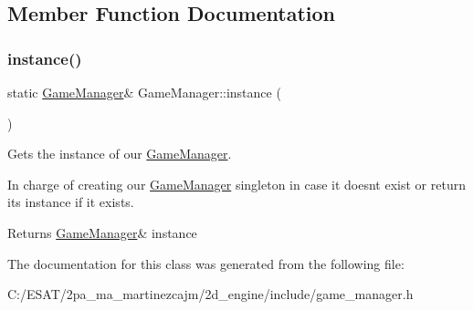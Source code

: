 \subsection{Member Function Documentation}
\mbox{\label{class_game_manager_afa37ab23c040b5225d567d4c9ab854e1}} 
\subsubsection{\texorpdfstring{instance()}{instance()}}
{\footnotesize\ttfamily static \hyperlink{class_game_manager}{Game\+Manager}\& Game\+Manager\+::instance (\begin{DoxyParamCaption}{ }\end{DoxyParamCaption})\hspace{0.3cm}{\ttfamily [static]}}



Gets the instance of our \hyperlink{class_game_manager}{Game\+Manager}. 

In charge of creating our \hyperlink{class_game_manager}{Game\+Manager} singleton in case it doesn\textquotesingle{}t exist or return it\textquotesingle{}s instance if it exists.

\begin{DoxyReturn}{Returns}
\hyperlink{class_game_manager}{Game\+Manager}\& instance 
\end{DoxyReturn}


The documentation for this class was generated from the following file\+:\begin{DoxyCompactItemize}
\item 
C\+:/\+E\+S\+A\+T/2pa\+\_\+ma\+\_\+martinezcajm/2d\+\_\+engine/include/game\+\_\+manager.\+h\end{DoxyCompactItemize}
